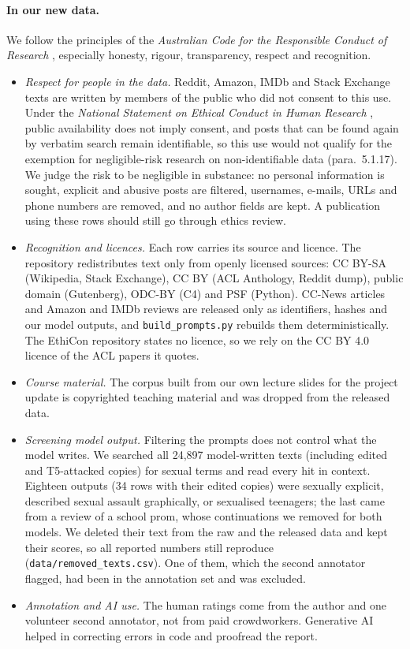 \documentclass[11pt]{article}
\newcommand{\code}[1]{\texttt{\small #1}}
\begin{document}
\paragraph{In our new data.}
We follow the principles of the \emph{Australian Code for the Responsible Conduct of Research} \citep{nhmrc2018code}, especially honesty, rigour, transparency, respect and recognition.
\begin{itemize}
\item \emph{Respect for people in the data.} Reddit, Amazon, IMDb and Stack Exchange texts are written by members of the public who did not consent to this use. Under the \emph{National Statement on Ethical Conduct in Human Research} \citep{nhmrc2023statement}, public availability does not imply consent, and posts that can be found again by verbatim search remain identifiable, so this use would not qualify for the exemption for negligible-risk research on non-identifiable data (para.~5.1.17). We judge the risk to be negligible in substance: no personal information is sought, explicit and abusive posts are filtered, usernames, e-mails, URLs and phone numbers are removed, and no author fields are kept. A publication using these rows should still go through ethics review.
\item \emph{Recognition and licences.} Each row carries its source and licence. The repository redistributes text only from openly licensed sources: CC BY-SA (Wikipedia, Stack Exchange), CC BY (ACL Anthology, Reddit dump), public domain (Gutenberg), ODC-BY (C4) and PSF (Python). CC-News articles and Amazon and IMDb reviews are released only as identifiers, hashes and our model outputs, and \code{build\_prompts.py} rebuilds them deterministically. The EthiCon repository states no licence, so we rely on the CC BY 4.0 licence of the ACL papers it quotes.
\item \emph{Course material.} The corpus built from our own lecture slides for the project update is copyrighted teaching material and was dropped from the released data.
\item \emph{Screening model output.} Filtering the prompts does not control what the model writes. We searched all 24{,}897 model-written texts (including edited and T5-attacked copies) for sexual terms and read every hit in context. Eighteen outputs (34 rows with their edited copies) were sexually explicit, described sexual assault graphically, or sexualised teenagers; the last came from a review of a school prom, whose continuations we removed for both models. We deleted their text from the raw and the released data and kept their scores, so all reported numbers still reproduce (\code{data/removed\_texts.csv}). One of them, which the second annotator flagged, had been in the annotation set and was excluded.
\item \emph{Annotation and AI use.} The human ratings come from the author and one volunteer second annotator, not from paid crowdworkers. Generative AI helped in correcting errors in code and proofread the report.\end{itemize}
\end{document}
